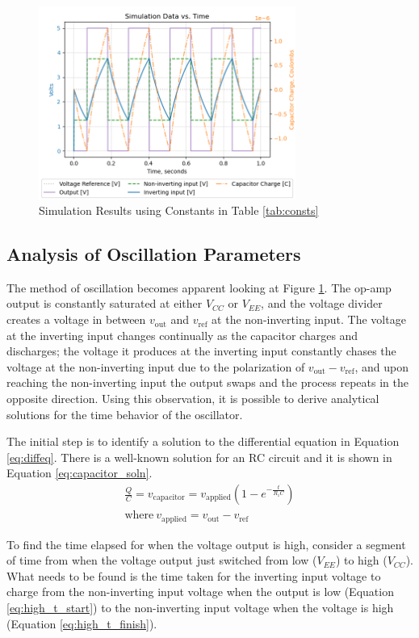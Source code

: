 \documentclass[12pt]{article}
\begin{document}
\begin{figure}[h!]
\centering
\includegraphics[width=0.75\textwidth]{Simulation_1.png}
\caption{Simulation Results using Constants in Table \ref{tab:consts}}
\label{fig:sim1}
\end{figure}

\subsection{Analysis of Oscillation Parameters} \label{sec:oscillate_params}
The method of oscillation becomes apparent looking at Figure \ref{fig:sim1}. The op-amp output is constantly saturated at either $V_{CC}$ or $V_{EE}$, and the voltage divider creates a voltage in between $v_\text{out}$ and $v_\text{ref}$ at the non-inverting input. The voltage at the inverting input changes continually as the capacitor charges and discharges; the voltage it produces at the inverting input constantly chases the voltage at the non-inverting input due to the polarization of $v_\text{out} - v_\text{ref}$, and upon reaching the non-inverting input the output swaps and the process repeats in the opposite direction. Using this observation, it is possible to derive analytical solutions for the time behavior of the oscillator.\par
The initial step is to identify a solution to the differential equation in Equation \ref{eq:diffeq}. There is a well-known solution for an RC circuit and it is shown in Equation \ref{eq:capacitor_soln}.
\begin{align} \label{eq:capacitor_soln}
    \frac{Q}{C} = v_\text{capacitor} = v_\text{applied} \left( 1 - e^{-\frac{t}{R_1C}} \right)\\
    \text{where}\ v_\text{applied} = v_\text{out} - v_\text{ref} \nonumber
\end{align}
\par
To find the time elapsed for when the voltage output is high, consider a segment of time from when the voltage output just switched from low ($V_{EE}$) to high ($V_{CC}$). What needs to be found is the time taken for the inverting input voltage to charge from the non-inverting input voltage when the output is low (Equation \ref{eq:high_t_start}) to the non-inverting input voltage when the voltage is high (Equation \ref{eq:high_t_finish}).
\end{document}

